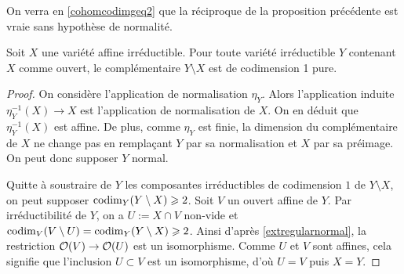 \begin{rem}
On verra en \ref{cohomcodimgeq2} que la réciproque de la proposition précédente est vraie sans hypothèse de normalité.
\end{rem}

\begin{prop}\label{codimaffinenormal}
Soit $X$ une variété affine irréductible. Pour toute variété irréductible $Y$ contenant $X$ comme ouvert, le complémentaire $Y\setminus X$ est de codimension 1 pure.
\end{prop}
\begin{proof}
On considère l'application de normalisation $\eta_Y$. Alors l'application induite $\eta_Y^{-1}(X)\rightarrow X$ est l'application de normalisation de $X$. On en déduit que $\eta_Y^{-1}(X)$ est affine. De plus, comme $\eta_Y$ est finie, la dimension du complémentaire de $X$ ne change pas en remplaçant $Y$ par sa normalisation et $X$ par sa préimage. On peut donc supposer $Y$ normal.

Quitte à soustraire de $Y$ les composantes irréductibles de codimension $1$ de $Y\setminus X$, on peut supposer $\operatorname{codim}_Y(Y\setminus X)\geqslant 2$. Soit $V$ un ouvert affine de $Y$. Par irréductibilité de $Y$, on a $U:=X\cap V$ non-vide et $\operatorname{codim}_V(V\setminus U)=\operatorname{codim}_Y(Y\setminus X)\geqslant 2$. Ainsi d'après \ref{extregularnormal}, la restriction $\mathcal{O}(V)\rightarrow \mathcal{O}(U)$ est un isomorphisme. Comme $U$ et $V$ sont affines, cela signifie que l'inclusion $U\subset V$ est un isomorphisme, d'où $U=V$ puis $X=Y$.
\end{proof}


